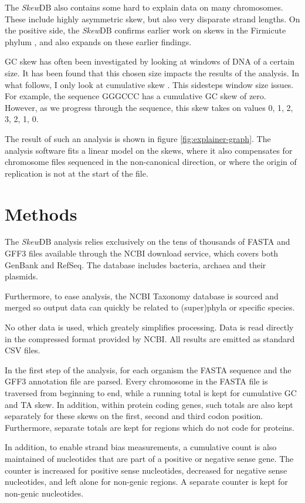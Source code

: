 \documentclass[fleqn,10pt]{wlscirep}
\begin{document}
The \emph{Skew}DB also contains some hard to explain data on many chromosomes. These include highly asymmetric skew, but also very disparate strand lengths. On the positive side, the \emph{Skew}DB confirms earlier work on skews in the Firmicute phylum  \cite{charneski_atypical_2011}, and also expands on these earlier findings.

GC skew has often been investigated by looking at windows of DNA of a certain size. It has been found that this chosen size impacts the results of the analysis. In what follows, I only look at cumulative skew \cite{grigoriev_analyzing_1998}. This sidesteps window size issues. For example, the sequence GGGCCC has a cumulative GC skew of zero. However, as we progress through the sequence, this skew takes on values 0, 1, 2, 3, 2, 1, 0.

The result of such an analysis is shown in figure \ref{fig:explainer-graph}. The analysis software fits a linear model on the skews, where it also compensates for chromosome files sequenced in the non-canonical direction, or where the origin of replication is not at the start of the file.

\section*{Methods}
The \emph{Skew}DB analysis relies exclusively on the tens of thousands of FASTA and GFF3 files available through the NCBI download service, which covers both GenBank and RefSeq. The database includes bacteria, archaea and their plasmids.

Furthermore, to ease analysis, the NCBI Taxonomy database is sourced and merged so output data can quickly be related to (super)phyla or specific species.

No other data is used, which greately simplifies processing. Data is read directly in the compressed format provided by NCBI. All results are emitted as standard CSV files.

In the first step of the analysis, for each organism the FASTA sequence and the GFF3 annotation file are parsed. Every chromosome in the FASTA file is traversed from beginning to end, while a running total is kept for cumulative GC and TA skew. In addition, within protein coding genes, such totals are also kept separately for these skews on the first, second and third codon position. Furthermore, separate totals are kept for regions which do not code for proteins.

In addition, to enable strand bias measurements, a cumulative count is also maintained of nucleotides that are part of a positive or negative sense gene. The counter is increased for positive sense nucleotides, decreased for negative sense nucleotides, and left alone for non-genic regions. A separate counter is kept for non-genic nucleotides. 
\end{document}
